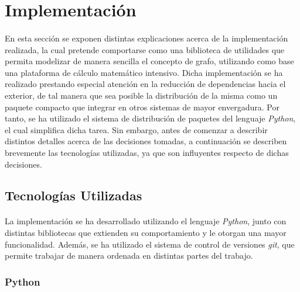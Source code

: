\documentclass{subfiles}
\begin{document}
    \section{Implementación}
    \label{sec:implementation}

      \paragraph{}
      En esta sección se exponen distintas explicaciones acerca de la implementación realizada, la cual pretende comportarse como una biblioteca de utilidades que permita modelizar de manera sencilla el concepto de grafo, utilizando como base una plataforma de cálculo matemático intensivo. Dicha implementación se ha realizado prestando especial atención en la reducción de dependencias hacia el exterior, de tal manera que sea posible la distribución de la misma como un paquete compacto que integrar en otros sistemas de mayor envergadura. Por tanto, se ha utilizado el sistema de distribución de paquetes del lenguaje \emph{Python}, el cual simplifica dicha tarea. Sin embargo, antes de comenzar a describir distintos detalles acerca de las decisiones tomadas, a continuación se describen brevemente las tecnologías utilizadas, ya que son influyentes respecto de dichas decisiones.

      \subsection{Tecnologías Utilizadas}
      \label{sec:used_technologies}

        \paragraph{}
        La implementación se ha desarrollado utilizando el lenguaje \emph{Python}, junto con distintas bibliotecas que extienden su comportamiento y le otorgan una mayor funcionalidad. Además, se ha utilizado el sistema de control de versiones \emph{git}, que permite trabajar de manera ordenada en distintas partes del trabajo.

        \subsubsection{Python}
        \label{sec:python}
\end{document}
